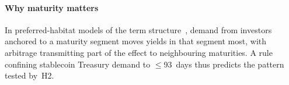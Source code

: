 \paragraph*{Why maturity matters} In preferred-habitat models of the term structure~\cite{vayanos2021}, demand from investors anchored to a maturity segment moves yields in that segment most, with arbitrage transmitting part of the effect to neighbouring maturities. A rule confining stablecoin Treasury demand to $\leq$93~days thus predicts the pattern tested by~H2.
